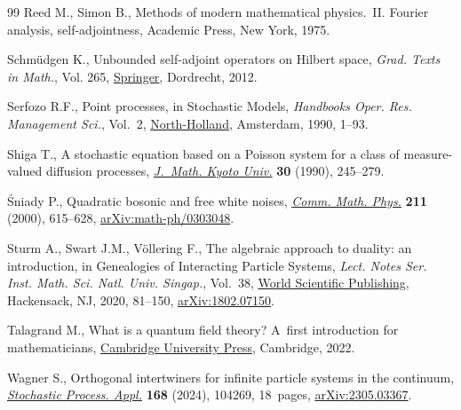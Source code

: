 \documentclass[pdftex]{sigma}
\numberwithin{equation}{section}
\newcommand{\1}{\mathbbm{1}}
\begin{document}
\begin{thebibliography}{99}
Reed M., Simon B., Methods of modern mathematical physics.~{II}. {F}ourier
 analysis, self-adjointness, Academic Press, New York, 1975.

Schm\"udgen K., Unbounded self-adjoint operators on Hilbert space,
 \textit{Grad. Texts in Math.}, Vol. 265, \href{https://doi.org/10.1007/978-94-007-4753-1}{Springer}, Dordrecht, 2012.

Serfozo R.F., Point processes, in Stochastic Models, \textit{Handbooks Oper.
 Res. Management Sci.}, Vol.~2, \href{https://doi.org/10.1016/S0927-0507(05)80165-3}{North-Holland}, Amsterdam, 1990, 1--93.

Shiga T., A stochastic equation based on a {P}oisson system for a class of
 measure-valued diffusion processes, \href{https://doi.org/10.1215/kjm/1250520071}{\textit{J.~Math. Kyoto Univ.}} \textbf{30}
 (1990), 245--279.

\'Sniady P., Quadratic bosonic and free white noises, \href{https://doi.org/10.1007/s002200050828}{\textit{Comm. Math.
 Phys.}} \textbf{211} (2000), 615--628, \href{https://arxiv.org/abs/math-ph/0303048}{arXiv:math-ph/0303048}.

Sturm A., Swart J.M., V\"ollering F., The algebraic approach to duality: an
 introduction, in Genealogies of Interacting Particle Systems, \textit{Lect.
 Notes Ser. Inst. Math. Sci. Natl. Univ. Singap.}, Vol.~38, \href{https://doi.org/10.1142/9789811206092_0003}{World Scientific
 Publishing}, Hackensack, NJ, 2020, 81--150, \href{https://arxiv.org/abs/1802.07150}{arXiv:1802.07150}.

Talagrand M., What is a quantum field theory? {A}~first introduction for
 mathematicians, \href{https://doi.org/10.1017/9781108225144}{Cambridge University Press}, Cambridge, 2022.

Wagner S., Orthogonal intertwiners for infinite particle systems in the
 continuum, \href{https://doi.org/10.1016/j.spa.2023.104269}{\textit{Stochastic Process. Appl.}} \textbf{168} (2024), 104269,
 18~pages, \href{https://arxiv.org/abs/2305.03367}{arXiv:2305.03367}.

\end{thebibliography}\LastPageEnding
\end{document}
